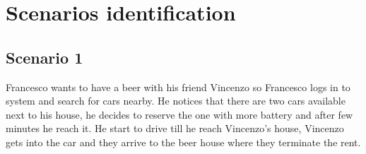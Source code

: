 \section{Scenarios identification}
\subsection{Scenario 1}
\label{scenario:1}
Francesco wants to have a beer with his friend Vincenzo so Francesco logs in to system and search for cars nearby. He notices that there are two cars available next to his house, he decides to reserve the one with more battery and after few minutes he reach it. He start to drive till he reach Vincenzo's house, Vincenzo gets into the car and they arrive to the beer house where they terminate the rent.